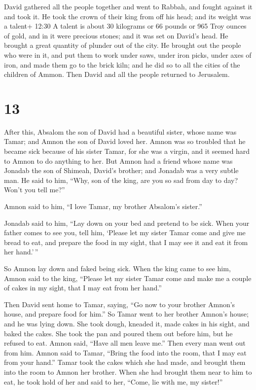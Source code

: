 David gathered all the people together and went to Rabbah,
and fought against it and took it.  He took the crown of
their king from off his head; and its weight was a talent+ 12:30 A
talent is about 30 kilograms or 66 pounds or 965 Troy ounces of gold,
and in it were precious stones; and it was set on David's head. He
brought a great quantity of plunder out of the city.  He
brought out the people who were in it, and put them to work under saws,
under iron picks, under axes of iron, and made them go to the brick
kiln; and he did so to all the cities of the children of Ammon. Then
David and all the people returned to Jerusalem.

\hypertarget{section-12}{%
\section{13}\label{section-12}}

 After this, Absalom the son of David had a beautiful
sister, whose name was Tamar; and Amnon the son of David loved her.
 Amnon was so troubled that he became sick because of his
sister Tamar, for she was a virgin, and it seemed hard to Amnon to do
anything to her.  But Amnon had a friend whose name was
Jonadab the son of Shimeah, David's brother; and Jonadab was a very
subtle man.  He said to him, ``Why, son of the king, are you
so sad from day to day? Won't you tell me?''

Amnon said to him, ``I love Tamar, my brother Absalom's sister.''

 Jonadab said to him, ``Lay down on your bed and pretend to
be sick. When your father comes to see you, tell him, `Please let my
sister Tamar come and give me bread to eat, and prepare the food in my
sight, that I may see it and eat it from her hand.'\,''

 So Amnon lay down and faked being sick. When the king came
to see him, Amnon said to the king, ``Please let my sister Tamar come
and make me a couple of cakes in my sight, that I may eat from her
hand.''

 Then David sent home to Tamar, saying, ``Go now to your
brother Amnon's house, and prepare food for him.''  So Tamar
went to her brother Amnon's house; and he was lying down. She took
dough, kneaded it, made cakes in his sight, and baked the cakes.
 She took the pan and poured them out before him, but he
refused to eat. Amnon said, ``Have all men leave me.'' Then every man
went out from him.  Amnon said to Tamar, ``Bring the food
into the room, that I may eat from your hand.'' Tamar took the cakes
which she had made, and brought them into the room to Amnon her brother.
 When she had brought them near to him to eat, he took hold
of her and said to her, ``Come, lie with me, my sister!''

